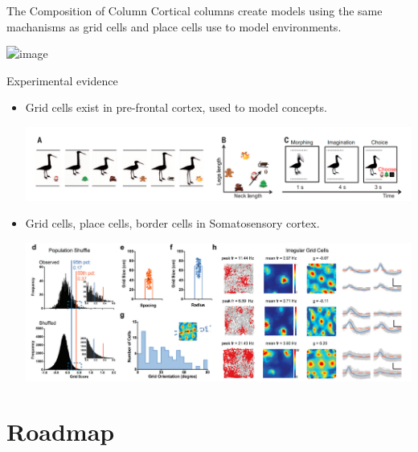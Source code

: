 \documentclass{beamer}
\begin{document}
\begin{frame}{The Composition of Column}
  Cortical columns create models using the same machanisms as grid cells and place cells use to model environments.
  \begin{center}
    \includegraphics<1>[width=.8\linewidth]{figs/column-composition.png}
  \end{center}
\end{frame}

\begin{frame}{Experimental evidence}
  \begin{itemize}
    \item Grid cells exist in pre-frontal cortex, used to model concepts.
    \begin{center}
      \includegraphics[width=.8\linewidth]{figs/ofc-gridlike.png}
    \end{center}
    \item Grid cells, place cells, border cells in Somatosensory cortex.
    \begin{center}
      \includegraphics[width=.8\linewidth]{figs/novel-somasensory.png}
    \end{center}
  \end{itemize}
\end{frame}

\section{Roadmap}
\end{document}
